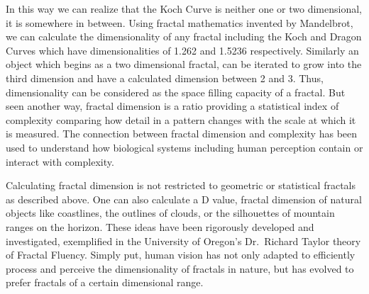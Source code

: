 \documentclass[english,jou]{apa6}
\begin{document}
In this way we can realize that the Koch Curve is neither one or two dimensional, it is somewhere in between. Using fractal mathematics invented by Mandelbrot, we can calculate the dimensionality of any fractal including the Koch and Dragon Curves which have dimensionalities of 1.262 and 1.5236 respectively. Similarly an object which begins as a two dimensional fractal, can be iterated to grow into the third dimension and have a calculated dimension between 2 and 3. Thus, dimensionality can be considered as the space filling capacity of a fractal. But seen another way, fractal dimension is a ratio providing a statistical index of complexity comparing how detail in a pattern changes with the scale at which it is measured. The connection between fractal dimension and complexity has been used to understand how biological systems including human perception contain or interact with complexity.

Calculating fractal dimension is not restricted to geometric or statistical fractals as described above. One can also calculate a D value, fractal dimension of natural objects like coastlines, the outlines of clouds, or the silhouettes of mountain ranges on the horizon. These ideas have been rigorously developed and investigated, exemplified in the University of Oregon's Dr.~Richard Taylor theory of Fractal Fluency. Simply put, human vision has not only adapted to efficiently process and perceive the dimensionality of fractals in nature, but has evolved to prefer fractals of a certain dimensional range.
\end{document}
